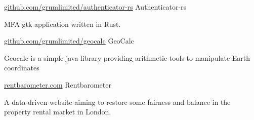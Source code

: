 

\begin{cventries}

  \cventry
    {\href{https://github.com/grumlimited/authenticator-rs}{github.com/grumlimited/authenticator-rs}} %
     {\hspace{0.2em}Authenticator-rs} %
    {} %
    {} %
    {}
    {
      \begin{cvitems} %
        \item {MFA gtk application written in Rust.}
      \end{cvitems}
    }


  \cventry
    {\href{https://github.com/grumlimited/geocalc}{github.com/grumlimited/geocalc}} %
    {\hspace{0.2em}GeoCalc} %
    {} %
    {} %
    {}
    {
      \begin{cvitems} %
        \item {Geocalc is a simple java library providing arithmetic tools to manipulate Earth coordinates}
      \end{cvitems}
    }

  \cventry
    {\href{https://www.rentbarometer.com}{rentbarometer.com}} %
    {\hspace{0.5em}Rentbarometer} %
    {} %
    {} %
    {}
    {
      \begin{cvitems} %
        \item {A data-driven website aiming to restore some fairness and balance in the property rental market in London.}
      \end{cvitems}
    }
\end{cventries}
